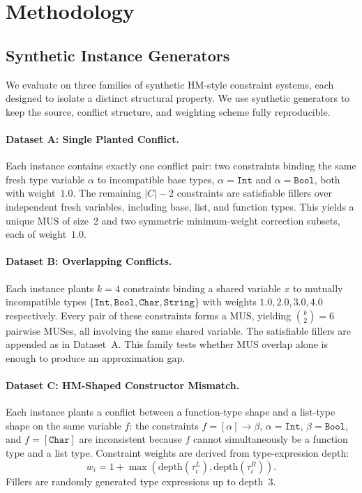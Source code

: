 \section{Methodology}
\label{sec:methodology}

\subsection{Synthetic Instance Generators}

We evaluate on three families of synthetic HM-style constraint systems, each
designed to isolate a distinct structural property. We use synthetic generators
to keep the source, conflict structure, and weighting scheme fully reproducible.

\paragraph{Dataset A: Single Planted Conflict.}
Each instance contains exactly one conflict pair: two constraints binding the
same fresh type variable $\alpha$ to incompatible base types,
$\alpha = \texttt{Int}$ and $\alpha = \texttt{Bool}$, both with weight~$1.0$.
The remaining $|C| - 2$ constraints are satisfiable fillers over independent
fresh variables, including base, list, and function types.
This yields a unique MUS of size~2 and two symmetric minimum-weight correction
subsets, each of weight~$1.0$.

\paragraph{Dataset B: Overlapping Conflicts.}
Each instance plants $k = 4$ constraints binding a shared variable
$x$ to mutually incompatible types $\{\texttt{Int}, \texttt{Bool},
\texttt{Char}, \texttt{String}\}$ with weights $1.0, 2.0, 3.0, 4.0$
respectively.
Every pair of these constraints forms a MUS, yielding $\binom{k}{2} = 6$
pairwise MUSes, all involving the same shared variable.
The satisfiable fillers are appended as in Dataset~A.
This family tests whether MUS overlap alone is enough to produce an
approximation gap.

\paragraph{Dataset C: HM-Shaped Constructor Mismatch.}
Each instance plants a conflict between a function-type shape and a list-type
shape on the same variable $f$: the constraints
$f = [\alpha] \to \beta$, $\alpha = \texttt{Int}$, $\beta = \texttt{Bool}$,
and $f = [\texttt{Char}]$ are inconsistent because $f$ cannot simultaneously
be a function type and a list type.
Constraint weights are derived from type-expression depth:
\[
w_i = 1 + \max(\mathrm{depth}(\tau_i^L), \mathrm{depth}(\tau_i^R)).
\]
Fillers are randomly generated type expressions up to depth~$3$.


